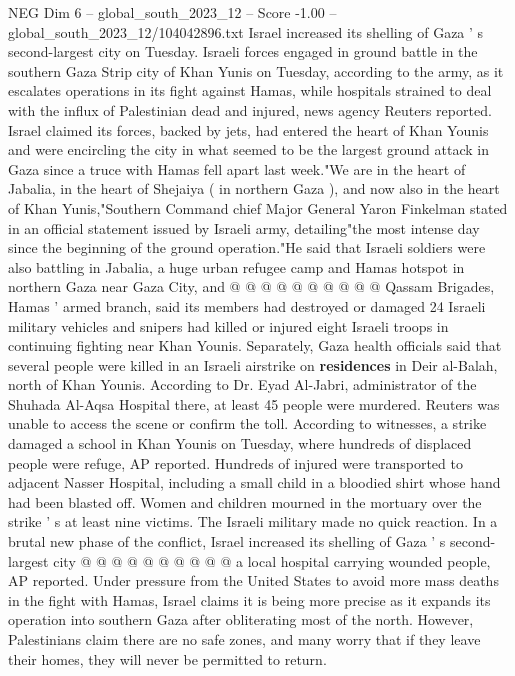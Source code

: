 \begin{textsample}{NEG Dim 6 – global\_south\_2023\_12 – Score -1.00 – global\_south\_2023\_12/104042896.txt}  \label{ex:f6_neg_349}
Israel increased its shelling of Gaza ' s second-largest city on Tuesday.
Israeli forces engaged in ground battle in the southern Gaza Strip city of Khan Yunis on Tuesday, according to the army, as it escalates operations in its fight against Hamas, while hospitals strained to deal with the influx of Palestinian dead and injured, news agency Reuters reported.
Israel claimed its forces, backed by jets, had entered the heart of Khan Younis and were encircling the city in what seemed to be the largest ground attack in Gaza since a truce with Hamas fell apart last week."We are in the heart of Jabalia, in the heart of Shejaiya ( in northern Gaza ), and now also in the heart of Khan Yunis,"Southern Command chief Major General Yaron Finkelman stated in an official statement issued by Israeli army, detailing"the most intense day since the beginning of the ground operation."He said that Israeli soldiers were also battling in Jabalia, a huge urban refugee camp and Hamas hotspot in northern Gaza near Gaza City, and @ @ @ @ @ @ @ @ @ @ Qassam Brigades, Hamas ' armed branch, said its members had destroyed or damaged 24 Israeli military vehicles and snipers had killed or injured eight Israeli troops in continuing fighting near Khan Younis.
Separately, Gaza health officials said that several people were killed in an Israeli airstrike on \textbf{residences} in Deir al-Balah, north of Khan Younis.
According to Dr.
Eyad Al-Jabri, administrator of the Shuhada Al-Aqsa Hospital there, at least 45 people were murdered.
Reuters was unable to access the scene or confirm the toll.
According to witnesses, a strike damaged a school in Khan Younis on Tuesday, where hundreds of displaced people were refuge, AP reported.
Hundreds of injured were transported to adjacent Nasser Hospital, including a small child in a bloodied shirt whose hand had been blasted off.
Women and children mourned in the mortuary over the strike ' s at least nine victims.
The Israeli military made no quick reaction.
In a brutal new phase of the conflict, Israel increased its shelling of Gaza ' s second-largest city @ @ @ @ @ @ @ @ @ @ a local hospital carrying wounded people, AP reported.
Under pressure from the United States to avoid more mass deaths in the fight with Hamas, Israel claims it is being more precise as it expands its operation into southern Gaza after obliterating most of the north.
However, Palestinians claim there are no safe zones, and many worry that if they leave their homes, they will never be permitted to return.

\end{textsample}
